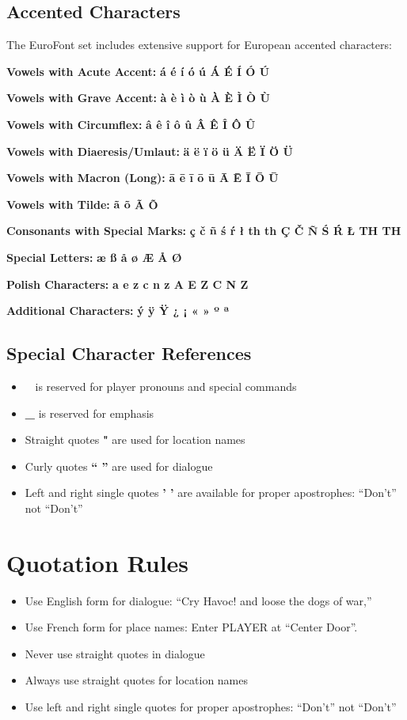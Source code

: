 \documentclass[11pt,letterpaper,oldstylefigures]{memoir}
\newcommand{\fountain}[1]{\textbf{#1}}
\begin{document}
\subsection{Accented Characters}

The EuroFont set includes extensive support for European accented characters:

\textbf{Vowels with Acute Accent:}
\fountain{á é í ó ú Á É Í Ó Ú}

\textbf{Vowels with Grave Accent:}
\fountain{à è ì ò ù À È Ì Ò Ù}

\textbf{Vowels with Circumflex:}
\fountain{â ê î ô û Â Ê Î Ô Û}

\textbf{Vowels with Diaeresis/Umlaut:}
\fountain{ä ë ï ö ü Ä Ë Ï Ö Ü}

\textbf{Vowels with Macron (Long):}
\fountain{ā ē ī ō ū Ā Ē Ī Ō Ū}

\textbf{Vowels with Tilde:}
\fountain{ã õ Ã Õ}

\textbf{Consonants with Special Marks:}
\fountain{ç č ñ ś ŕ ł th th Ç Č Ñ Ś Ŕ Ł TH TH}

\textbf{Special Letters:}
\fountain{æ ß å ø Æ Å Ø}

\textbf{Polish Characters:}
\fountain{a e z c n z A E Z C N Z}

\textbf{Additional Characters:}
\fountain{ý ÿ Ÿ ¿ ¡ « » º ª}

\subsection{Special Character References}

\begin{itemize}
\item \fountain{~} is reserved for player pronouns and special commands
\item \fountain{\_} is reserved for emphasis
\item Straight quotes \fountain{"} are used for location names
\item Curly quotes \fountain{`` ''} are used for dialogue
\item Left and right single quotes \fountain{' '} are available for proper apostrophes: ``Don't'' not ``Don't''
\end{itemize}

\section{Quotation Rules}

\begin{itemize}
\item Use English form for dialogue: ``Cry Havoc! and loose the dogs of war,''
\item Use French form for place names: Enter PLAYER at ``Center Door''.
\item Never use straight quotes in dialogue
\item Always use straight quotes for location names
\item Use left and right single quotes for proper apostrophes: ``Don't'' not ``Don't''
\end{itemize}
\end{document}

